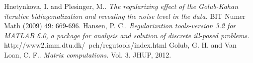 \documentclass[11pt]{amsart}
\begin{document}
\begin{thebibliography}{1}
    Hnetynkova, I. and Plesinger, M.. 
    \emph{The regularizing effect of the Golub-Kahan iterative bidiagonalization 
      and revealing the noise level in the data.}
      BIT Numer Math (2009) 49: 669-696.
     Hansen, P. C.. 
    \emph{Regularization tools-version 3.2 for 
      MATLAB 6.0, a package for analysis and solution of discrete ill-posed 
      problems.} 
      http://www2.imm.dtu.dk/~pch/regutools/index.html
     Golub, G. H. and Van Loan, C. F.. 
     \emph{Matrix computations.} 
     Vol. 3. JHUP, 2012.
\end{thebibliography}
\end{document}
